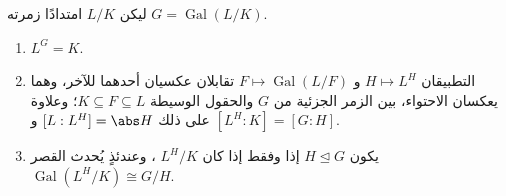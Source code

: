 \begin{theorem}
\label{thm:b3:galois:fundamental}
ليكن $L/K$ امتدادًا  زمرته $G =
\operatorname{Gal}(L/K)$.
\begin{enumerate}
  \item $L^G = K$.
  \item التطبيقان $H \mapsto L^H$ و $F \mapsto
        \operatorname{Gal}(L/F)$ تقابلان عكسيان
        أحدهما للآخر، وهما يعكسان الاحتواء، بين الزمر الجزئية من
        $G$ والحقول الوسيطة $K \subseteq F \subseteq L$؛ وعلاوة على ذلك $[L : L^H] = \abs H$
        و $[L^H : K] = [G : H]$.
  \item يكون $H \trianglelefteq G$ إذا وفقط إذا كان $L^H/K$ ، وعندئذٍ
        يُحدث القصر $\operatorname{Gal}(L^H/K) \cong
        G/H$.
\end{enumerate}
\end{theorem}

